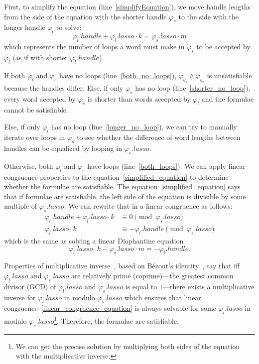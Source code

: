 First, to simplify the equation (line~\ref{simplifyEquation}), we move handle lengths from the side of the equation with the shorter handle $\varphi_s$ to the side with the longer handle $\varphi_l$ to solve:
\begin{equation}\label{simplified_equation}
    \varphi_{l}.handle + \varphi_{l}.lasso \cdot k = \varphi_{s}.lasso \cdot m
\end{equation}
which represents the number of loops a word must make in $\varphi_{s}$ to be accepted by $\varphi_l$ (as if with shorter $\varphi_l.handle$).

If both $\varphi_l$ and $\varphi_s$ have no loops (line~\ref{both_no_loops}), $\varphi_{q_1} \land \varphi_{q_2}$ is unsatisfiable because the handles differ. Else, if only $\varphi_s$ has no loop (line~\ref{shorter_no_loop}), every word accepted by $\varphi_s$ is shorter than words accepted by $\varphi_l$ and the formulae cannot be satisfiable.

Else, if only $\varphi_l$ has no loop (line~\ref{longer_no_loop}), we can try to manually iterate over loops in $\varphi_s$ to see whether the difference of word lengths between handles can be equalized by looping in $\varphi_s.lasso$.

Otherwise, both $\varphi_l$ and $\varphi_s$ have loops (line~\ref{both_loops}). We can apply linear congruence properties to the equation~\ref{simplified_equation} to determine whether the formulae are satisfiable. The equation~\ref{simplified_equation} says that if formulae are satisfiable, the left side of the equation is divisible by some multiple of $\varphi_s.lasso$. We can rewrite that in a linear congruence as follows:
\begin{align}
    \varphi_{l}.handle + \varphi_{l}.lasso \cdot k &\equiv 0 \pmod{\varphi_s.lasso} \\
    \varphi_{l}.lasso \cdot k &\equiv - \varphi_{l}.handle  \pmod{\varphi_s.lasso} \label{linear_congruence_equation}
\end{align}
which is the same as solving a linear Diophantine equation
\begin{equation}
    \varphi_{l}.lasso \cdot k - \varphi_s.lasso \cdot m = - \varphi_{l}.handle \text{.} \label{linear_diophantine_equation}
\end{equation}

Properties of multiplicative inverse~\cite{DivisibilityAndGreatestCommonDiviser, LinearCongruences}, based on Bézout's identity~\cite{DivisibilityAndGreatestCommonDiviser}, say that iff $\varphi_l.lasso$ and $\varphi_s.lasso$ are relatively prime (coprime)---the greatest common divisor (GCD) of $\varphi_l.lasso$ and $\varphi_s.lasso$ is equal to $1$---there exists a multiplicative inverse for $\varphi_l.lasso$ in modulo $\varphi_s.lasso$ which ensures that linear congruence~\ref{linear_congruence_equation} is always solvable for some $\varphi_l.lasso$ in modulo $\varphi_s.lasso$\footnote{We can get the precise solution by multiplying both sides of the equation with the multiplicative inverse.}. Therefore, the formulae are satisfiable.

